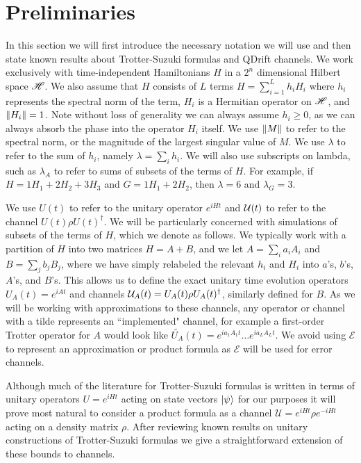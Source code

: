 \section{Preliminaries} \label{sec:prelim}
In this section we will first introduce the necessary notation we will use and then state known results about Trotter-Suzuki formulas and QDrift
channels. We work exclusively with time-independent Hamiltonians $H$ in a $2^n$ dimensional Hilbert space $\mathscr{H}$. We also assume that $H$
consists of $L$ terms $H = \sum_{i = 1}^L h_i H_i$ where $h_i$ represents the spectral norm of the term, $H_i$ is a Hermitian operator on $\mathscr{H}$, and $\norm{H_i} = 1$. Note without loss of generality we can always assume $h_i \geq 0$, as we can always absorb the phase into the 
operator $H_i$ itself. We use $\norm{M}$ to refer to the spectral norm, or the magnitude of the largest singular value of $M$. We use $\lambda$ to refer to the sum of $h_i$, namely $\lambda = \sum_i h_i$. We will also use subscripts on lambda, such as $\lambda_A$ to refer to sums of subsets of the terms of $H$. For example, if $H = 1 H_1 + 2 H_2 + 3 H_3$ and $G = 1 H_1 + 2 H_2$, then $\lambda = 6$ and $\lambda_G = 3$. 

We use $U(t)$ to refer to the unitary operator $e^{iHt}$ and $\mathcal{U}(t)$ to refer to the channel $U(t) \rho U(t)^\dagger$. We will be particularly
concerned with simulations of subsets of the terms of $H$, which we denote as follows. We typically work with a partition of $H$ into two matrices
$H = A + B$, and we let $A = \sum_i a_i A_i$ and $B = \sum_j b_j B_j$, where we have simply relabeled the relevant $h_i$ and $H_i$ into $a$'s, $b$'s, $A$'s, and $B$'s. This allows us to define the exact unitary time evolution operators $U_A(t) = e^{i A t}$ and channels $\mathcal{U}_A(t) = U_A(t) \rho U_A(t)^\dagger$, similarly defined for $B$. As we will be working with approximations to these channels, any operator or channel with a tilde represents
an ``implemented" channel, for example a first-order Trotter operator for $A$ would look like $\widetilde{U_A}(t) = e^{i a_1 A_1 t} \ldots e^{i a_L A_L t}$. We avoid using $\mathcal{E}$ to represent an approximation or product formula as $\mathcal{E}$ will be used for error channels.

Although much of the literature for Trotter-Suzuki formulas is written in terms of unitary operators $U = e^{i H t}$ acting on state vectors $\ket{\psi}$ for our purposes it will prove most natural to consider a product formula as a channel $\mathcal{U} = e^{iHt} \rho e^{-iHt}$ acting on a density matrix $\rho$. After reviewing known results on unitary constructions of Trotter-Suzuki formulas we give a straightforward extension
of these bounds to channels. 

